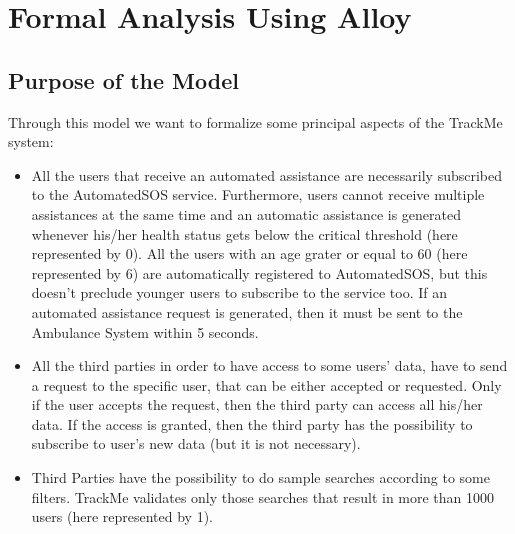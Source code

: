 \documentclass[12pt,a4paper]{article}
\begin{document}
	\newpage
	\section{Formal Analysis Using Alloy}
		\subsection{Purpose of the Model}
			Through this model we want to formalize some principal aspects of the TrackMe system:
			\begin{itemize}
				\item All the users that receive an automated assistance are necessarily subscribed to the AutomatedSOS service. 
				Furthermore, users cannot receive multiple assistances at the same time and an automatic assistance is generated 
				whenever his/her health status gets below the critical threshold (here represented by 0). All the users with an age grater or equal to 60 (here represented by 6) are automatically registered to AutomatedSOS, but this doesn't preclude younger users to subscribe to the service too. If an automated assistance request is generated, then it must be sent to the Ambulance System within 5 seconds.
				\item All the third parties in order to have access to some users' data, have to send a request to the specific user, that can be either accepted or requested. Only if the user accepts the request, then the third party can access all his/her data. If the access is granted, then the third party has the possibility to subscribe to user's new data (but it is not necessary).
				\item Third Parties have the possibility to do sample searches according to some filters. TrackMe validates only those searches that result in more than 1000 users (here represented by 1). 
			\end{itemize}
\end{document}
